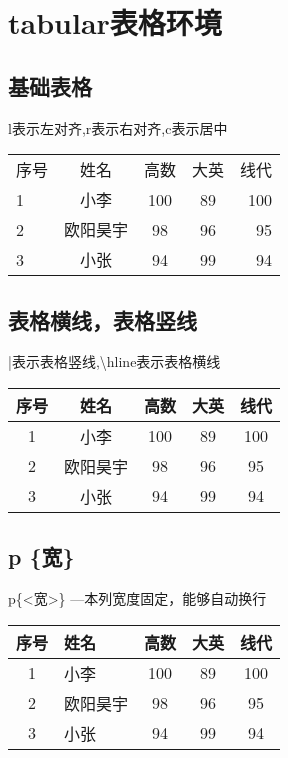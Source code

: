\documentclass{article}
\begin{document}
	\section{tabular表格环境}
	
	\subsection{基础表格}
	l表示左对齐,r表示右对齐,c表示居中 
	
	\begin{tabular}{l c c c r}  
		序号 & 姓名 & 高数 & 大英 & 线代 \\
		1    & 小李 & 100 & 89 & 100 \\
		2	 & 欧阳昊宇 & 98 & 96 & 95 \\
		3    & 小张 & 94 & 99 & 94 	
	\end{tabular}
	
	\subsection{表格横线，表格竖线}
	|表示表格竖线,\textbackslash hline表示表格横线 \\
	
	\begin{tabular}{|c|c|c|c|c|}
		\hline
		序号 & 姓名 & 高数 & 大英 & 线代 \\
		\hline
		1    & 小李 & 100 & 89 & 100 \\
		\hline
		2	 & 欧阳昊宇 & 98 & 96 & 95 \\
		\hline
		3    & 小张 & 94 & 99 & 94 \\
		\hline
	\end{tabular}

	\subsection{p \{宽\}}
	p\{<宽>\} ---本列宽度固定，能够自动换行
		\begin{tabular}{|c|p{0.5cm}|c|c|c|}
		\hline
		序号 & 姓名 & 高数 & 大英 & 线代 \\
		\hline
		1    & 小李 & 100 & 89 & 100 \\
		\hline
		2	 & 欧阳昊宇 & 98 & 96 & 95 \\
		\hline
		3    & 小张 & 94 & 99 & 94 \\
		\hline
	\end{tabular}
\end{document}
